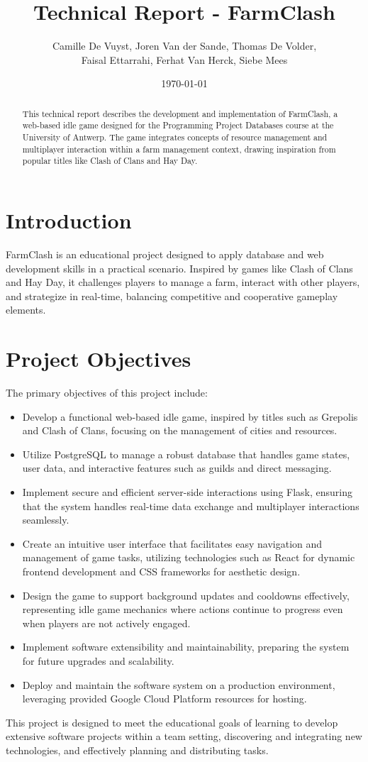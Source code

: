\documentclass[12pt]{article}
\title{Technical Report - FarmClash}
\author{Camille De Vuyst, Joren Van der Sande, Thomas De Volder,\\ Faisal Ettarrahi, Ferhat Van Herck, Siebe Mees}
\date{\today}
\begin{document}
\maketitle
\tableofcontents
\newpage

\begin{abstract}
This technical report describes the development and implementation of FarmClash, a web-based idle game designed for the Programming Project Databases course at the University of Antwerp. The game integrates concepts of resource management and multiplayer interaction within a farm management context, drawing inspiration from popular titles like Clash of Clans and Hay Day.
\end{abstract}

\section{Introduction}
FarmClash is an educational project designed to apply database and web development skills in a practical scenario. Inspired by games like Clash of Clans and Hay Day, it challenges players to manage a farm, interact with other players, and strategize in real-time, balancing competitive and cooperative gameplay elements.

\section{Project Objectives}
The primary objectives of this project include:
\begin{itemize}
    \item Develop a functional web-based idle game, inspired by titles such as Grepolis and Clash of Clans, focusing on the management of cities and resources.
    \item Utilize PostgreSQL to manage a robust database that handles game states, user data, and interactive features such as guilds and direct messaging.
    \item Implement secure and efficient server-side interactions using Flask, ensuring that the system handles real-time data exchange and multiplayer interactions seamlessly.
    \item Create an intuitive user interface that facilitates easy navigation and management of game tasks, utilizing technologies such as React for dynamic frontend development and CSS frameworks for aesthetic design.
    \item Design the game to support background updates and cooldowns effectively, representing idle game mechanics where actions continue to progress even when players are not actively engaged.
    \item Implement software extensibility and maintainability, preparing the system for future upgrades and scalability.
    \item Deploy and maintain the software system on a production environment, leveraging provided Google Cloud Platform resources for hosting.
\end{itemize}
This project is designed to meet the educational goals of learning to develop extensive software projects within a team setting, discovering and integrating new technologies, and effectively planning and distributing tasks.
\end{document}
